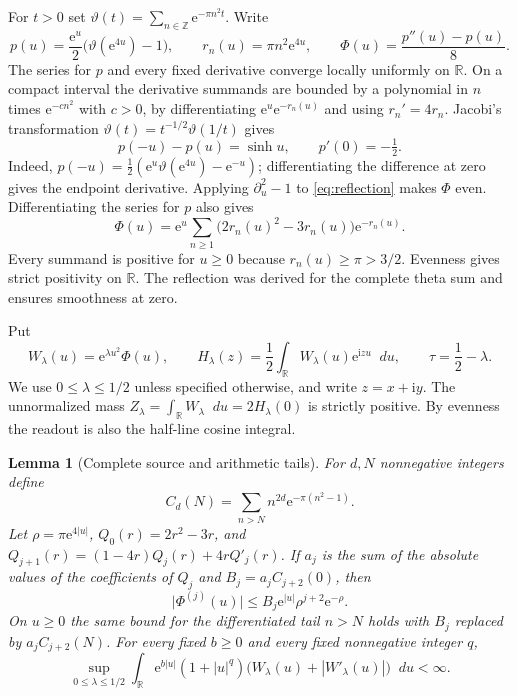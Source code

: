 \documentclass[11pt]{article}
\newtheorem{lemma}[theorem]{Lemma}
\newcommand{\R}{\mathbb R}
\newcommand{\dd}{\mathop{}\!d}
\newcommand{\ee}{\mathrm e}
\newcommand{\ii}{\mathrm i}
\newcommand{\abs}[1]{\lvert#1\rvert}
\begin{document}
For \(t>0\) set \(\vartheta(t)=\sum_{n\in\mathbb Z}\ee^{-\pi n^2t}\).
Write
\[
 p(u)=\frac{\ee^u}{2}\bigl(\vartheta(\ee^{4u})-1\bigr),\qquad
 r_n(u)=\pi n^2\ee^{4u},\qquad
 \Phi(u)=\frac{p''(u)-p(u)}8.
\]
The series for \(p\) and every fixed derivative converge locally
uniformly on \(\R\). On a compact interval the derivative summands
are bounded by a polynomial in \(n\) times \(\ee^{-c n^2}\) with
\(c>0\), by differentiating \(\ee^u\ee^{-r_n(u)}\) and using
\(r_n'=4r_n\). Jacobi's transformation
\(\vartheta(t)=t^{-1/2}\vartheta(1/t)\)
\cite[20.2.3 and 20.7.32]{DLMFTheta} gives
\begin{equation}\label{eq:reflection}
 p(-u)-p(u)=\sinh u,\qquad p'(0)=-\tfrac12 .
\end{equation}
Indeed, \(p(-u)=\frac12(\ee^u\vartheta(\ee^{4u})-\ee^{-u})\);
differentiating the difference at zero gives the endpoint derivative.
Applying \(\partial_u^2-1\) to \eqref{eq:reflection} makes \(\Phi\)
even. Differentiating the series for \(p\) also gives
\begin{equation}\label{eq:theta-source}
 \Phi(u)=\ee^u\sum_{n\ge1}\bigl(2r_n(u)^2-3r_n(u)\bigr)\ee^{-r_n(u)}.
\end{equation}
Every summand is positive for \(u\ge0\) because \(r_n(u)\ge\pi>3/2\).
Evenness gives strict positivity on \(\R\). The reflection was derived
for the complete theta sum and ensures smoothness at zero.

Put
\begin{equation}\label{eq:conventions}
 W_\lambda(u)=\ee^{\lambda u^2}\Phi(u),\qquad
 H_\lambda(z)=\frac12\int_{\R} W_\lambda(u)\ee^{\ii zu}\dd u,\qquad
 \tau=\frac12-\lambda .
\end{equation}
We use \(0\le\lambda\le1/2\) unless specified otherwise, and write
\(z=x+\ii y\). The unnormalized mass
\(Z_\lambda=\int_{\R}W_\lambda\dd u=2H_\lambda(0)\) is strictly
positive. By evenness the readout is also the half-line cosine integral.

\begin{lemma}[Complete source and arithmetic tails]\label{lem:source}
For \(d,N\) nonnegative integers define
\[
 C_d(N)=\sum_{n>N}n^{2d}\ee^{-\pi(n^2-1)}.
\]
Let \(\rho=\pi\ee^{4|u|}\), \(Q_0(r)=2r^2-3r\), and
\(Q_{j+1}(r)=(1-4r)Q_j(r)+4rQ'_j(r)\).
If \(a_j\) is the sum of the absolute values of the coefficients of
\(Q_j\) and \(B_j=a_j C_{j+2}(0)\), then
\begin{equation}\label{eq:complete-dom}
 \abs{\Phi^{(j)}(u)}\le B_j\ee^{|u|}\rho^{j+2}\ee^{-\rho}.
\end{equation}
On \(u\ge0\) the same bound for the differentiated tail \(n>N\)
holds with \(B_j\) replaced by \(a_j C_{j+2}(N)\).
For every fixed \(b\ge0\) and every fixed nonnegative integer \(q\),
\[
 \sup_{0\le\lambda\le1/2}\int_{\R}
   \ee^{b|u|}(1+|u|^q)\bigl(W_\lambda(u)+|W'_\lambda(u)|\bigr)\dd u
   <\infty .
\]
\end{lemma}
\end{document}
